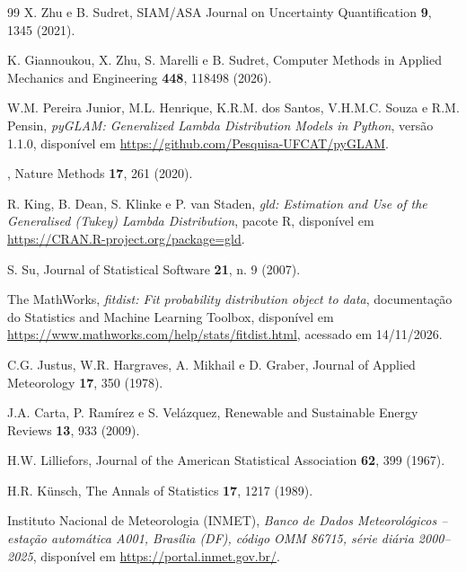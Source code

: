 \begin{thebibliography}{99}
 X. Zhu e B. Sudret, SIAM/ASA Journal on Uncertainty Quantification \textbf{9}, 1345 (2021).

 K. Giannoukou, X. Zhu, S. Marelli e B. Sudret, Computer Methods in Applied Mechanics and Engineering \textbf{448}, 118498 (2026).

 W.M. Pereira Junior, M.L. Henrique, K.R.M. dos Santos, V.H.M.C. Souza e R.M. Pensin, \textit{pyGLAM: Generalized Lambda Distribution Models in Python}, versão 1.1.0, disponível em \url{https://github.com/Pesquisa-UFCAT/pyGLAM}.

 , Nature Methods \textbf{17}, 261 (2020).

 R. King, B. Dean, S. Klinke e P. van Staden, \textit{gld: Estimation and Use of the Generalised (Tukey) Lambda Distribution}, pacote R, disponível em \url{https://CRAN.R-project.org/package=gld}.

 S. Su, Journal of Statistical Software \textbf{21}, n. 9 (2007).

 The MathWorks, \textit{fitdist: Fit probability distribution object to data}, documentação do Statistics and Machine Learning Toolbox, disponível em \url{https://www.mathworks.com/help/stats/fitdist.html}, acessado em 14/11/2026.

 C.G. Justus, W.R. Hargraves, A. Mikhail e D. Graber, Journal of Applied Meteorology \textbf{17}, 350 (1978).

 J.A. Carta, P. Ramírez e S. Velázquez, Renewable and Sustainable Energy Reviews \textbf{13}, 933 (2009).

 H.W. Lilliefors, Journal of the American Statistical Association \textbf{62}, 399 (1967).

 H.R. Künsch, The Annals of Statistics \textbf{17}, 1217 (1989).

 Instituto Nacional de Meteorologia (INMET), \textit{Banco de Dados Meteorológicos -- estação automática A001, Brasília (DF), código OMM 86715, série diária 2000--2025}, disponível em \url{https://portal.inmet.gov.br/}.

 

\end{thebibliography}
